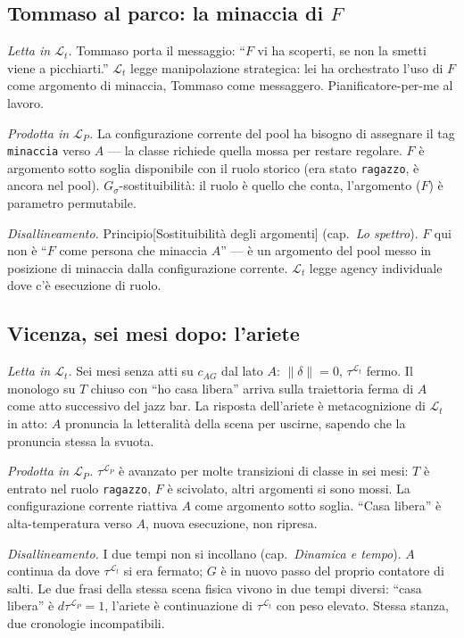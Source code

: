 \documentclass[
    oneside,                 %
    openany,                 %
    titlepage,
    11pt,
    a4paper,
    italian,
    DIV=14,                  %
    headinclude,
    footinclude=true,
    cleardoublepage=empty
]{scrbook}
\theoremstyle{ctplain}
\theoremstyle{ctdef}
\theoremstyle{ctrem}
\newcommand{\Lt}{\mathcal{L}_t}
\newcommand{\LP}{\mathcal{L}_P}
\newcommand{\Gs}{G_{\sigma}}
\begin{document}
\subsection*{Tommaso al parco: la minaccia di $F$}

\emph{Letta in $\Lt$.} Tommaso porta il messaggio: ``$F$ vi ha scoperti, se non la smetti viene a picchiarti.'' $\Lt$ legge manipolazione strategica: lei ha orchestrato l'uso di $F$ come argomento di minaccia, Tommaso come messaggero. Pianificatore-per-me al lavoro.

\emph{Prodotta in $\LP$.} La configurazione corrente del pool ha bisogno di assegnare il tag \texttt{minaccia} verso $A$ --- la classe richiede quella mossa per restare regolare. $F$ è argomento sotto soglia disponibile con il ruolo storico (era stato \texttt{ragazzo}, è ancora nel pool). $\Gs$-sostituibilità: il ruolo è quello che conta, l'argomento ($F$) è parametro permutabile.

\emph{Disallineamento.} Principio[Sostituibilità degli argomenti] (cap.~\emph{Lo spettro}). $F$ qui non è ``$F$ come persona che minaccia $A$'' --- è un argomento del pool messo in posizione di minaccia dalla configurazione corrente. $\Lt$ legge agency individuale dove c'è esecuzione di ruolo.

\subsection*{Vicenza, sei mesi dopo: l'ariete}

\emph{Letta in $\Lt$.} Sei mesi senza atti su $c_{AG}$ dal lato $A$: $\|\delta\| = 0$, $\tau^{\Lt}$ fermo. Il monologo su $T$ chiuso con ``ho casa libera'' arriva sulla traiettoria ferma di $A$ come atto successivo del jazz bar. La risposta dell'ariete è metacognizione di $\Lt$ in atto: $A$ pronuncia la letteralità della scena per uscirne, sapendo che la pronuncia stessa la svuota.

\emph{Prodotta in $\LP$.} $\tau^{\LP}$ è avanzato per molte transizioni di classe in sei mesi: $T$ è entrato nel ruolo \texttt{ragazzo}, $F$ è scivolato, altri argomenti si sono mossi. La configurazione corrente riattiva $A$ come argomento sotto soglia. ``Casa libera'' è alta-temperatura verso $A$, nuova esecuzione, non ripresa.

\emph{Disallineamento.} I due tempi non si incollano (cap.~\emph{Dinamica e tempo}). $A$ continua da dove $\tau^{\Lt}$ si era fermato; $G$ è in nuovo passo del proprio contatore di salti. Le due frasi della stessa scena fisica vivono in due tempi diversi: ``casa libera'' è $d\tau^{\LP} = 1$, l'ariete è continuazione di $\tau^{\Lt}$ con peso elevato. Stessa stanza, due cronologie incompatibili.
\end{document}

